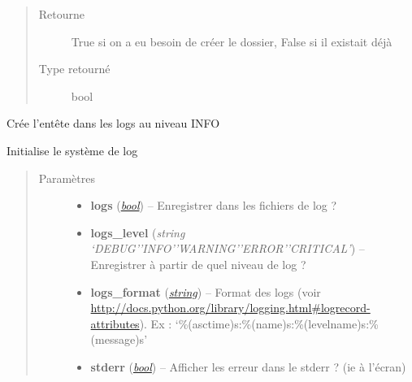 \documentclass[letterpaper,10pt,french]{sphinxmanual}
\begin{document}
\begin{fulllineitems}
\begin{fulllineitems}
\begin{quote}
\begin{description}
\item[{Retourne}] \leavevmode
True si on a eu besoin de créer le dossier, False si il existait déjà

\item[{Type retourné}] \leavevmode
bool

\end{description}\end{quote}

\end{fulllineitems}


\begin{fulllineitems}
\label{log:lib.log.Log.ecrire_entete}
Crée l'entête dans les logs au niveau INFO

\end{fulllineitems}


\begin{fulllineitems}
\label{log:lib.log.Log.initialisation}
Initialise le système de log
\begin{quote}\begin{description}
\item[{Paramètres}] \leavevmode\begin{itemize}
\item {} 
\textbf{logs} (\href{http://docs.python.org/library/functions.html\#bool}{\emph{bool}}) -- Enregistrer dans les fichiers de log ?

\item {} 
\textbf{logs\_level} (\emph{string `DEBUG'\textbar{}'INFO'\textbar{}'WARNING'\textbar{}'ERROR'\textbar{}'CRITICAL'}) -- Enregistrer à partir de quel niveau de log ?

\item {} 
\textbf{logs\_format} (\href{http://docs.python.org/library/string.html\#module-string}{\emph{string}}) -- Format des logs (voir \href{http://docs.python.org/library/logging.html\#logrecord-attributes}{http://docs.python.org/library/logging.html\#logrecord-attributes}). Ex : `\%(asctime)s:\%(name)s:\%(levelname)s:\%(message)s'

\item {} 
\textbf{stderr} (\href{http://docs.python.org/library/functions.html\#bool}{\emph{bool}}) -- Afficher les erreur dans le stderr ? (ie à l'écran)


\end{itemize}
\end{description}
\end{quote}
\end{fulllineitems}
\end{fulllineitems}
\end{document}
